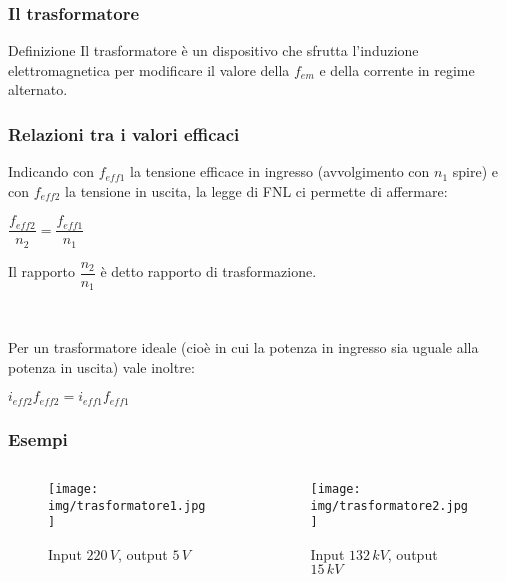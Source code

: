 \documentclass[]{beamer}
\theoremstyle{plain}
\newcommand{\fem}{f_{em}}
\begin{document}
\begin{frame}
\frametitle{Il trasformatore}
\begin{block}{Definizione}
  Il trasformatore è un dispositivo che sfrutta l'induzione elettromagnetica per modificare il valore della $ \fem $ e della corrente in regime alternato.
\end{block}


\end{frame}


\begin{frame}
\frametitle{Relazioni tra i valori efficaci}
Indicando con $ f_{eff1} $ la tensione efficace in ingresso (avvolgimento con $ n_1 $ spire) e con $ f_{eff2} $ la tensione in uscita, la legge di FNL ci permette di affermare:
\begin{center}
\colorbox{blue!30}{$ \dfrac{f_{eff2}}{n_2} = \dfrac{f_{eff1}}{n_1} $}
\end{center}\pause
Il rapporto $ \dfrac{n_2}{n_1} $ è detto \alert<2>{rapporto di trasformazione}.\pause

~

Per un trasformatore ideale (cioè in cui la potenza in ingresso sia uguale alla potenza in uscita) vale inoltre:
\begin{center}
\colorbox{blue!30}{$ i_{eff2} f_{eff2} = i_{eff1} f_{eff1} $}
\end{center}
\end{frame}


\begin{frame}
\frametitle{Esempi}

\begin{columns}
\begin{column}{0.45\textwidth}
\begin{figure}
\texttt{[image: img/trasformatore1.jpg]}

Input $ 220 \, V $, output $ 5 \, V $
\end{figure}
\end{column}
\begin{column}{0.45\textwidth}
\begin{figure}
\texttt{[image: img/trasformatore2.jpg]}

Input $ 132 \, kV $, output $ 15 \, kV $
\end{figure}
\end{column}
\end{columns}
\end{frame}
\end{document}

